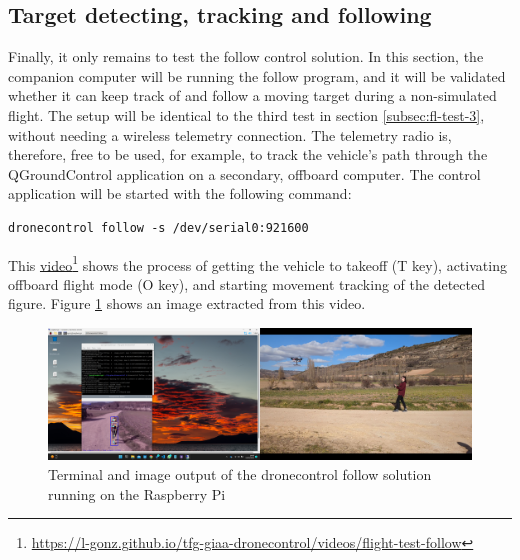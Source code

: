 \subsection{Target detecting, tracking and following}
\label{subsec:fl-test-5}


Finally, it only remains to test the follow control solution.
In this section, the companion computer will be running the follow program, and it will be validated whether it can keep track of and follow a moving target during a non-simulated flight.
The setup will be identical to the third test in section \ref{subsec:fl-test-3}, without needing a wireless telemetry connection.
The telemetry radio is, therefore, free to be used, for example, to track the vehicle's path through the QGroundControl application on a secondary, offboard computer.
The control application will be started with the following command:
\begin{verbatim}
dronecontrol follow -s /dev/serial0:921600
\end{verbatim}
This \href{https://l-gonz.github.io/tfg-giaa-dronecontrol/videos/flight-test-follow}{video}\footnote{\url{https://l-gonz.github.io/tfg-giaa-dronecontrol/videos/flight-test-follow}} shows the process of getting the vehicle to takeoff (T key), activating offboard flight mode (O key), and starting movement tracking of the detected figure.
Figure \ref{fig:flight-test-follow} shows an image extracted from this video.


\begin{figure}
  \centering
  \includegraphics[width=\textwidth, keepaspectratio]{img/video-field-test-follow.png}
  \caption{Terminal and image output of the dronecontrol follow solution running on the Raspberry Pi}
  \label{fig:flight-test-follow}
\end{figure}

